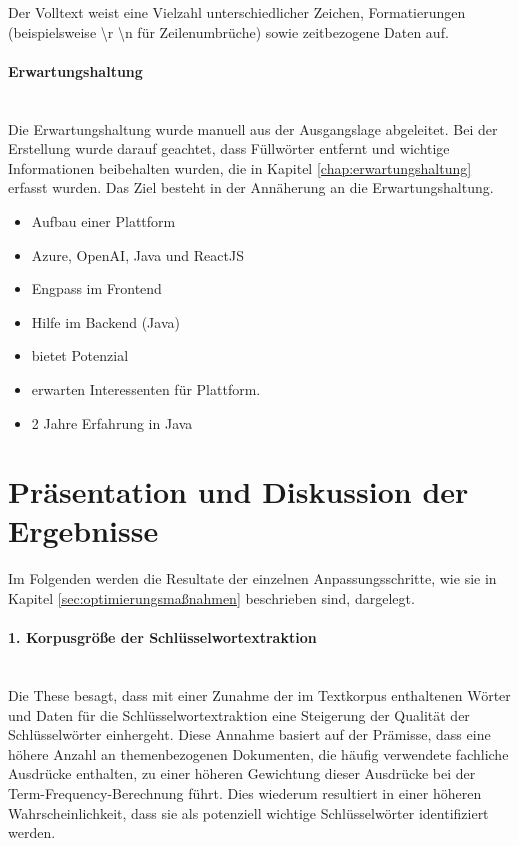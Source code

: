 Der Volltext weist eine Vielzahl unterschiedlicher Zeichen, Formatierungen (beispielsweise \textbackslash r \textbackslash n für Zeilenumbrüche) sowie zeitbezogene Daten auf.
\paragraph{Erwartungshaltung}\mbox{}\\
Die Erwartungshaltung wurde manuell aus der Ausgangslage abgeleitet. Bei der Erstellung wurde darauf geachtet, dass Füllwörter entfernt und wichtige Informationen beibehalten wurden, die in Kapitel \ref{chap:erwartungshaltung} erfasst wurden. Das Ziel besteht in der Annäherung an die Erwartungshaltung.
\begin{itemize}
	\item Aufbau einer Plattform
	\item Azure, OpenAI, Java und ReactJS
	\item Engpass im Frontend
	\item Hilfe im Backend (Java)
	\item bietet Potenzial
	\item erwarten Interessenten für Plattform.
	\item 2 Jahre Erfahrung in Java
\end{itemize}
\section{Präsentation und Diskussion der Ergebnisse}
Im Folgenden werden die Resultate der einzelnen Anpassungsschritte, wie sie in Kapitel \ref{sec:optimierungsmaßnahmen} beschrieben sind, dargelegt.
\paragraph{1. Korpusgröße der Schlüsselwortextraktion}\mbox{}\\
Die These besagt, dass mit einer Zunahme der im Textkorpus enthaltenen Wörter und Daten für die Schlüsselwortextraktion eine Steigerung der Qualität der Schlüsselwörter einhergeht. Diese Annahme basiert auf der Prämisse, dass eine höhere Anzahl an themenbezogenen Dokumenten, die häufig verwendete fachliche Ausdrücke enthalten, zu einer höheren Gewichtung dieser Ausdrücke bei der Term-Frequency-Berechnung führt. Dies wiederum resultiert in einer höheren Wahrscheinlichkeit, dass sie als potenziell wichtige Schlüsselwörter identifiziert werden.\\


